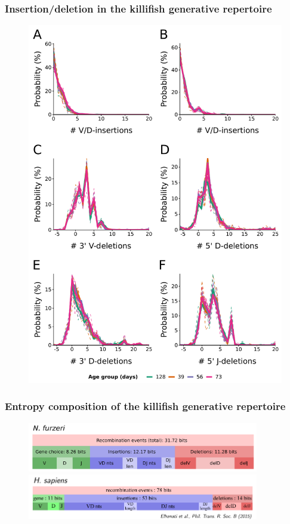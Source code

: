 \documentclass[presentation]{beamer}
\newlength{\slideheight}
\begin{document}
\begin{frame}
\frametitle{Insertion/deletion in the killifish generative repertoire}
\begin{figure}
\includegraphics[height=0.95\slideheight]{figs/pdf/extra/ageing-igor-indels}
\end{figure}
\end{frame}

\begin{frame}
\frametitle{Entropy composition of the killifish generative repertoire}
\begin{figure}
\includegraphics[width=0.9\textwidth]{figs/pdf/extra/pilot-igor-entropies}\\
\includegraphics[width=0.9\textwidth]{figs/pdf/extra/human-repertoire-entropy}
\end{figure}
\end{frame}
\end{document}
